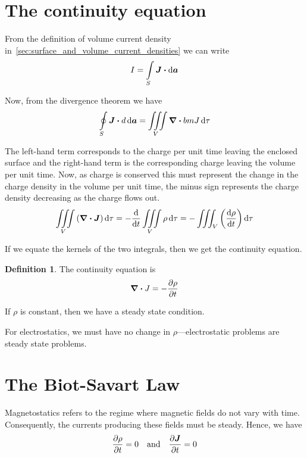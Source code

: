 \documentclass[12pt,chapterprefix=false,dvipsnames]{scrbook}
\theoremstyle{dotless}
\theoremstyle{definition}
\newtheorem{protodefinition}{Definition}[section]
\newenvironment{definition}
{\colorlet{shadecolor}{black!15}\begin{shaded}\begin{protodefinition}}
			{\end{protodefinition}\end{shaded}}
\begin{document}
\section{The continuity equation}%
\label{sec:the_continuity_equation}

From the definition of volume current density
in~\ref{sec:surface_and_volume_current_densities} we can write
\begin{equation}
	I = \int\limits_{S}\bm{J}\vdot
	\dd{\bm{a}}
\end{equation}

Now, from the divergence theorem we have
\begin{equation}
	\oint\limits_{S}\bm{J}\vdot
	d\dd{\bm{a}} =
	\iiint\limits_{V}\divergence{bm{J}}\dd{\tau}
\end{equation}

The left-hand term corresponds to the charge per unit time
leaving the enclosed surface and the right-hand term is the
corresponding charge leaving the volume per unit time. Now, as
charge is conserved this must represent the change in the charge
density in the volume per unit time, the minus sign represents
the charge density decreasing as the charge flows out.
\begin{equation}
	\iiint\limits_V\left(\divergence{\bm{J}}\right)\dd{\tau}
	=
	-\dv{}{t}\iiint\limits_V\rho
	\dd{\tau}
	=
	-\iiint_V \left(\dv{\rho}{t}\right)\dd{\tau}
\end{equation}

If we equate the kernels of the two integrals, then we get the
continuity equation.
\begin{definition}
	The continuity equation is
	\begin{equation}
		\label{eq:continuity_equation}
		\divergence{J} = -\pdv{\rho}{t}
	\end{equation}

	If $\rho$ is constant, then we have a steady
	state condition.
\end{definition}

For electrostatics, we must have no change in
$\rho$---electrostatic problems are steady
state problems.

\section{The Biot-Savart Law}%
\label{sec:the_biot_savart_law}

Magnetostatics refers to the regime where magnetic fields do not
vary with time. Consequently, the currents producing these
fields must be steady. Hence, we have
\begin{equation}
	\pdv{\rho}{t} = 0\hspace{1em}
	\mathrm{and}\hspace{1em}\pdv{\bm{J}}{t}
	= 0
\end{equation}
\end{document}
